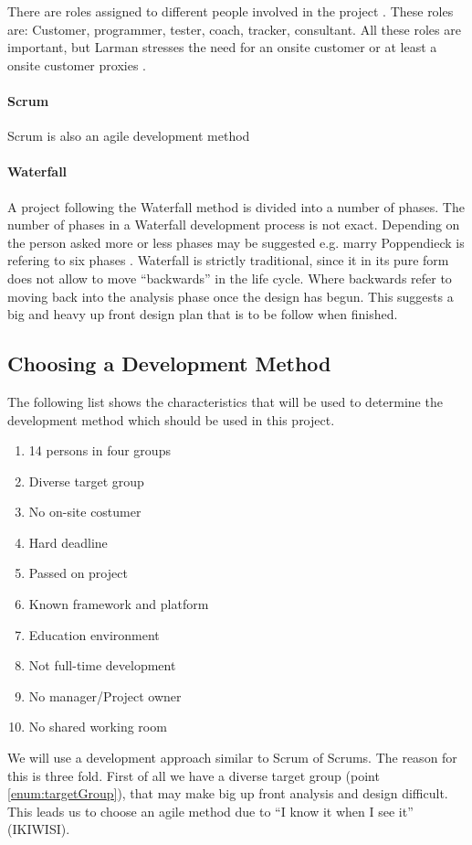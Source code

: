 There are roles assigned to different people involved in the project \cite[p.~145]{Larman04}.
These roles are: Customer, programmer, tester, coach, tracker, consultant.
All these roles are important, but Larman stresses the need for an onsite customer or at least a onsite customer proxies \cite[p.~152-156]{Larman04}.

\paragraph{Scrum}
Scrum is also an agile development method


\paragraph{Waterfall}
A project following the Waterfall method is divided into a number of phases.
The number of phases in a Waterfall development process is not exact.
Depending on the person asked more or less phases may be suggested e.g. marry Poppendieck is refering to six phases \cite{Poppendieck00}.
Waterfall is strictly traditional, since it in its pure form does not allow to move ``backwards'' in the life cycle.
Where backwards refer to moving back into the analysis phase once the design has begun.
This suggests a big and heavy up front design plan that is to be follow when finished.

\subsection{Choosing a Development Method}
The following list shows the characteristics that will be used to determine the development method which should be used in this project.
\begin{enumerate}
	\item 14 persons in four groups \label{enum:groupSize}
	\item Diverse target group \label{enum:targetGroup}
	\item No on-site costumer \label{enum:onsite}
	\item Hard deadline \label{enum:deadline}
	\item Passed on project \label{enum:passed}
	\item Known framework and platform \label{enum:framework}
	\item Education environment \label{enum:education}
	\item Not full-time development \label{enum:halftime}
	\item No manager/Project owner \label{enum:manager}
	\item No shared working room \label{enum:room}
\end{enumerate}
We will use a development approach similar to Scrum of Scrums.
The reason for this is three fold.
First of all we have a diverse target group (point \ref{enum:targetGroup}), that may make big up front analysis and design difficult.
This leads us to choose an agile method due to ``I know it when I see it'' (IKIWISI).

